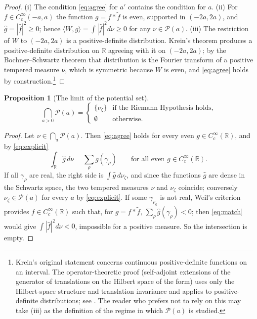\documentclass[11pt]{article}
\newtheorem{proposition}{Proposition}
\theoremstyle{definition}
\theoremstyle{remark}
\newcommand{\R}{\mathbb{R}}
\begin{document}
\begin{proof}
(i) The condition \eqref{eq:agree} for $a'$ contains the condition for $a$. (ii) For $f\in C_c^\infty(-a,a)$ the function $g=f*\tilde f$ is even, supported in $(-2a,2a)$, and $\widehat g=|\widehat f|^2\ge0$; hence $\langle W,g\rangle=\int|\widehat f|^2d\nu\ge0$ for any $\nu\in\mathcal P(a)$. (iii) The restriction of $W$ to $(-2a,2a)$ is a positive-definite distribution. Krein's theorem produces a positive-definite distribution on $\R$ agreeing with it on $(-2a,2a)$; by the Bochner--Schwartz theorem that distribution is the Fourier transform of a positive tempered measure $\nu$, which is symmetric because $W$ is even, and \eqref{eq:agree} holds by construction.\footnote{Krein's original statement concerns continuous positive-definite functions on an interval. The operator-theoretic proof (self-adjoint extensions of the generator of translations on the Hilbert space of the form) uses only the Hilbert-space structure and translation invariance and applies to positive-definite distributions; see \cite{jpt}. The reader who prefers not to rely on this may take (iii) as the definition of the regime in which $\mathcal P(a)$ is studied.}
\end{proof}

\begin{proposition}[The limit of the potential set]\label{prop:limit}
\[
\bigcap_{a>0}\mathcal P(a)=\begin{cases}\{\nu_\zeta\}&\text{if the Riemann Hypothesis holds},\\ \emptyset&\text{otherwise.}\end{cases}
\]
\end{proposition}

\begin{proof}
Let $\nu\in\bigcap_a\mathcal P(a)$. Then \eqref{eq:agree} holds for every even $g\in C_c^\infty(\R)$, and by \eqref{eq:explicit}
\begin{equation}\label{eq:match}
\int_\R\widehat g\,d\nu=\sum_\rho\widehat g(\gamma_\rho)\qquad\text{for all even }g\in C_c^\infty(\R).
\end{equation}
If all $\gamma_\rho$ are real, the right side is $\int\widehat g\,d\nu_\zeta$, and since the functions $\widehat g$ are dense in the Schwartz space, the two tempered measures $\nu$ and $\nu_\zeta$ coincide; conversely $\nu_\zeta\in\mathcal P(a)$ for every $a$ by \eqref{eq:explicit}. If some $\gamma_{\rho_0}$ is not real, Weil's criterion \cite{weil,bombieri} provides $f\in C_c^\infty(\R)$ such that, for $g=f*\tilde f$, $\sum_\rho\widehat g(\gamma_\rho)<0$; then \eqref{eq:match} would give $\int|\widehat f|^2d\nu<0$, impossible for a positive measure. So the intersection is empty.
\end{proof}
\end{document}
